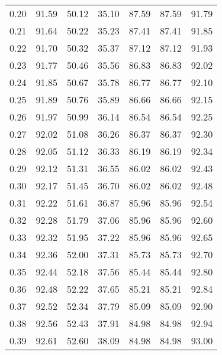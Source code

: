 \begin{tabular}{|c|c|c|c|c|c|c|}
      0.20 &     91.59 &     50.12 &      35.10 &   87.59 &      87.59 &         91.79 \\
      0.21 &     91.64 &     50.22 &      35.23 &   87.41 &      87.41 &         91.85 \\
      0.22 &     91.70 &     50.32 &      35.37 &   87.12 &      87.12 &         91.93 \\
      0.23 &     91.77 &     50.46 &      35.56 &   86.83 &      86.83 &         92.02 \\
      0.24 &     91.85 &     50.67 &      35.78 &   86.77 &      86.77 &         92.10 \\
      0.25 &     91.89 &     50.76 &      35.89 &   86.66 &      86.66 &         92.15 \\
      0.26 &     91.97 &     50.99 &      36.14 &   86.54 &      86.54 &         92.25 \\
      0.27 &     92.02 &     51.08 &      36.26 &   86.37 &      86.37 &         92.30 \\
      0.28 &     92.05 &     51.12 &      36.33 &   86.19 &      86.19 &         92.34 \\
      0.29 &     92.12 &     51.31 &      36.55 &   86.02 &      86.02 &         92.43 \\
      0.30 &     92.17 &     51.45 &      36.70 &   86.02 &      86.02 &         92.48 \\
      0.31 &     92.22 &     51.61 &      36.87 &   85.96 &      85.96 &         92.54 \\
      0.32 &     92.28 &     51.79 &      37.06 &   85.96 &      85.96 &         92.60 \\
      0.33 &     92.32 &     51.95 &      37.22 &   85.96 &      85.96 &         92.65 \\
      0.34 &     92.36 &     52.00 &      37.31 &   85.73 &      85.73 &         92.70 \\
      0.35 &     92.44 &     52.18 &      37.56 &   85.44 &      85.44 &         92.80 \\
      0.36 &     92.48 &     52.22 &      37.65 &   85.21 &      85.21 &         92.84 \\
      0.37 &     92.52 &     52.34 &      37.79 &   85.09 &      85.09 &         92.90 \\
      0.38 &     92.56 &     52.43 &      37.91 &   84.98 &      84.98 &         92.94 \\
      0.39 &     92.61 &     52.60 &      38.09 &   84.98 &      84.98 &         93.00 \\

\end{tabular}
